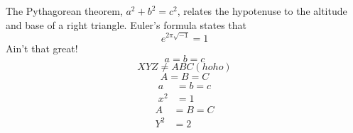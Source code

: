 The Pythagorean theorem, $a^2 + b^2 = c^2$,
relates the hypotenuse to the altitude
and base of a right triangle.
Euler’s formula states that
\[
e^{2\pi \sqrt{-1}} = 1
\]
Ain’t that great!
\begin{equation}
a = b = c
\end{equation}
\begin{equation}
\label{hoho}
XYZ \ne ABC (hoho)
\end{equation}
\begin{equation}
A = B = C
\end{equation}
\begin{equation}
\begin{split}
a &= b = c \\
x^2 &= 1
\end{split}
\end{equation}
\begin{equation}
\begin{split}
A &= B = C \\
Y^2 &= 2
\end{split}
\end{equation}
